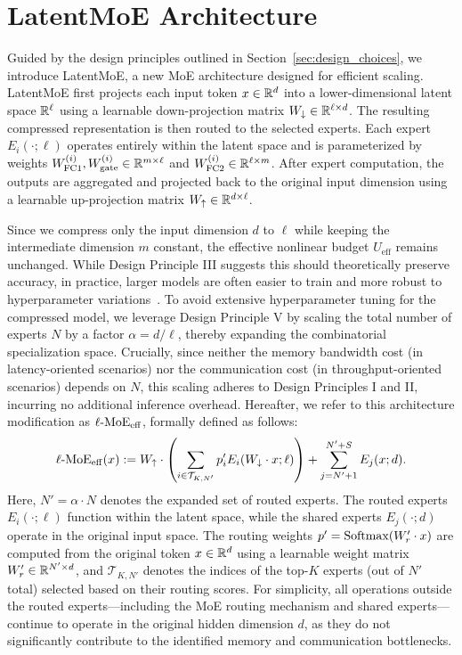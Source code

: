 \section{LatentMoE Architecture} \label{sec:latentmoe}
Guided by the design principles outlined in Section~\ref{sec:design_choices}, we introduce LatentMoE, a new MoE architecture designed for efficient scaling. LatentMoE first projects each input token $x \in \mathbb{R}^d$ into a lower-dimensional latent space $\mathbb{R}^{\ell}$ using a learnable down-projection matrix $W_{\downarrow} \in \mathbb{R}^{\ell \times d}$. The resulting compressed representation is then routed to the selected experts. Each expert $E_i(\cdot; \ell)$ operates entirely within the latent space and is parameterized by weights $W_{\text{FC1}}^{(i)}, W_{\text{gate}}^{(i)} \in \mathbb{R}^{m \times \ell}$ and $W_{\text{FC2}}^{(i)} \in \mathbb{R}^{\ell \times m}$. After expert computation, the outputs are aggregated and projected back to the original input dimension using a learnable up-projection matrix $W_\uparrow \in \mathbb{R}^{d \times \ell}$.


Since we compress only the input dimension $d$ to $\ell$ while keeping the intermediate dimension $m$ constant, the effective nonlinear budget $U_\mathrm{eff}$ remains unchanged. While Design Principle III suggests this should theoretically preserve accuracy, in practice, larger models are often easier to train and more robust to hyperparameter variations~\citep{lottery_ticket_hypothesis, novak2018sensitivity, sensitivity_analysis}. To avoid extensive hyperparameter tuning for the compressed model, we leverage Design Principle V by scaling the total number of experts $N$ by a factor $\alpha = d/\ell$, thereby expanding the combinatorial specialization space.
Crucially, since neither the memory bandwidth cost (in latency-oriented scenarios) nor the communication cost (in throughput-oriented scenarios) depends on $N$, this scaling adheres to Design Principles I and II, incurring no additional inference overhead. Hereafter, we refer to this architecture modification as $\operatorname{\ell-MoE}_\mathrm{eff}$, formally defined as follows:
\begin{equation}
\label{eq:latent_moe_eff}
\operatorname{\ell-MoE}_\mathrm{eff}(x) := W_{\uparrow} \cdot \left( \sum_{i \in \mathcal{T}_{K,N'}} p'_i E_i(W_\downarrow \cdot x; \ell) \right) + \sum_{j=N'+1}^{N'+S} E_j(x; d).
\end{equation}
Here, $N' = \alpha \cdot N$ denotes the expanded set of routed experts. The routed experts $E_i(\cdot; \ell)$ function within the latent space, while the shared experts $E_j(\cdot; d)$ operate in the original input space. The routing weights $p' = \operatorname{Softmax}(W'_r \cdot x)$ are computed from the original token $x \in \mathbb{R}^d$ using a learnable weight matrix $W'_r \in \mathbb{R}^{N' \times d}$, and $\mathcal{T}_{K,N'}$ denotes the indices of the top-$K$ experts (out of $N'$ total) selected based on their routing scores. For simplicity, all operations outside the routed experts---including the MoE routing mechanism and shared experts---continue to operate in the original hidden dimension $d$, as they do not significantly contribute to the identified memory and communication bottlenecks.

